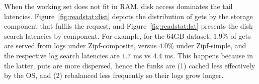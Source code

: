 When the working set does not fit in RAM, disk access dominates the tail latencies.
Figure~\ref{fig:readstat:dist} depicts the distribution of gets by the storage  component 
that fulfils the request, and Figure~\ref{fig:readstat:lat} presents the disk search latencies by component. 
For example, for the 64GB dataset, $1.9\%$ of gets are served from logs under Zipf-composite, versus $4.0\%$ under Zipf-simple,
and the respective log search latencies are $1.7$ ms vs $4.4$ ms. This happens because in the latter, puts are more dispersed, 
hence the funks are (1) cached less effectively by the OS, and (2) rebalanced less frequently so their logs grow longer.

